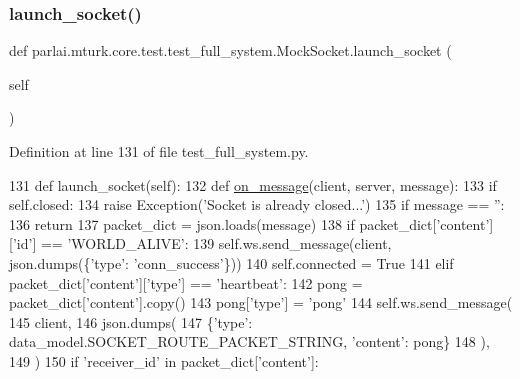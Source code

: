 \subsubsection{\texorpdfstring{launch\+\_\+socket()}{launch\_socket()}}
{\footnotesize\ttfamily def parlai.\+mturk.\+core.\+test.\+test\+\_\+full\+\_\+system.\+Mock\+Socket.\+launch\+\_\+socket (\begin{DoxyParamCaption}\item[{}]{self }\end{DoxyParamCaption})}



Definition at line 131 of file test\+\_\+full\+\_\+system.\+py.


\begin{DoxyCode}
131     \textcolor{keyword}{def }launch\_socket(self):
132         \textcolor{keyword}{def }\hyperlink{namespaceparlai_1_1chat__service_1_1services_1_1browser__chat_1_1client_a01c1536b48e2f5badd2fe58ea02b9a5c}{on\_message}(client, server, message):
133             \textcolor{keywordflow}{if} self.closed:
134                 \textcolor{keywordflow}{raise} Exception(\textcolor{stringliteral}{'Socket is already closed...'})
135             \textcolor{keywordflow}{if} message == \textcolor{stringliteral}{''}:
136                 \textcolor{keywordflow}{return}
137             packet\_dict = json.loads(message)
138             \textcolor{keywordflow}{if} packet\_dict[\textcolor{stringliteral}{'content'}][\textcolor{stringliteral}{'id'}] == \textcolor{stringliteral}{'WORLD\_ALIVE'}:
139                 self.ws.send\_message(client, json.dumps(\{\textcolor{stringliteral}{'type'}: \textcolor{stringliteral}{'conn\_success'}\}))
140                 self.connected = \textcolor{keyword}{True}
141             \textcolor{keywordflow}{elif} packet\_dict[\textcolor{stringliteral}{'content'}][\textcolor{stringliteral}{'type'}] == \textcolor{stringliteral}{'heartbeat'}:
142                 pong = packet\_dict[\textcolor{stringliteral}{'content'}].copy()
143                 pong[\textcolor{stringliteral}{'type'}] = \textcolor{stringliteral}{'pong'}
144                 self.ws.send\_message(
145                     client,
146                     json.dumps(
147                         \{\textcolor{stringliteral}{'type'}: data\_model.SOCKET\_ROUTE\_PACKET\_STRING, \textcolor{stringliteral}{'content'}: pong\}
148                     ),
149                 )
150             \textcolor{keywordflow}{if} \textcolor{stringliteral}{'receiver\_id'} \textcolor{keywordflow}{in} packet\_dict[\textcolor{stringliteral}{'content'}]:

\end{DoxyCode}
